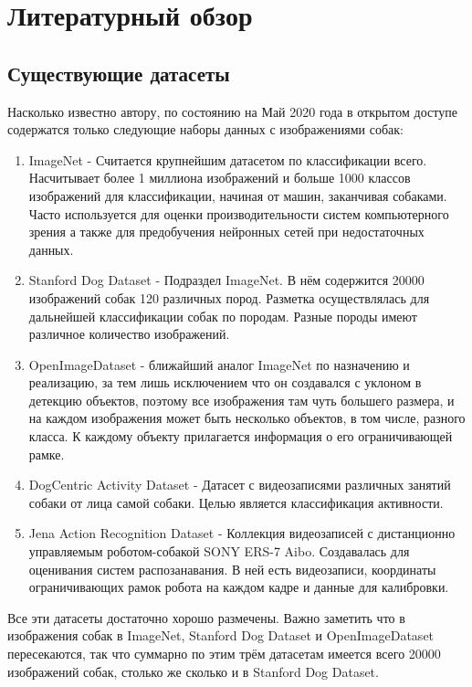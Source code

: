 \chapter{Литературный обзор} \label{chapt1}

\section{Существующие датасеты} \label{sect1_1}
Насколько известно автору, по состоянию на Май 2020 года в открытом доступе содержатся только следующие наборы данных с изображениями собак:
\begin{enumerate}
  \item ImageNet \cite{imagenet} - Считается крупнейшим датасетом по классификации всего. Насчитывает более 1 миллиона изображений и больше 1000 классов изображений для классификации, начиная от машин, заканчивая собаками. Часто используется для оценки производительности систем компьютерного зрения а также для предобучения нейронных сетей при недостаточных данных.
  \item Stanford Dog Dataset \cite{KhoslaYaoJayadevaprakashFeiFei_FGVC2011} - Подраздел ImageNet. В нём содержится 20000 изображений собак 120 различных пород. Разметка осуществлялась для дальнейшей классификации собак по породам. Разные породы имеют различное количество изображений.
  \item OpenImageDataset \cite{openimagedataset} - ближайший аналог ImageNet по назначению и реализацию, за тем лишь исключением что он создавался с уклоном в детекцию объектов, поэтому все изображения там чуть большего размера, и на каждом изображения может быть несколько объектов, в том числе, разного класса. К каждому объекту прилагается информация о его ограничивающей рамке.
  \item DogCentric Activity Dataset \cite{yumi2014first} - Датасет с видеозаписями различных занятий собаки от лица самой собаки. Целью является классификация активности.
  \item Jena Action Recognition Dataset \cite{jena} - Коллекция видеозаписей с дистанционно управляемым роботом-собакой SONY ERS-7 Aibo. Создавалась для оценивания систем распозанавания. В ней есть видеозаписи, координаты ограничивающих рамок робота на каждом кадре и данные для калибровки.
\end{enumerate}
Все эти датасеты достаточно хорошо размечены. Важно заметить что в изображения собак в ImageNet, Stanford Dog Dataset и OpenImageDataset пересекаются, так что суммарно по этим трём датасетам имеется всего 20000 изображений собак, столько же сколько и в Stanford Dog Dataset.

